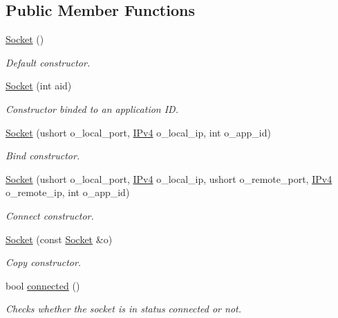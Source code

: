 \subsection*{Public Member Functions}
\begin{DoxyCompactItemize}
\item 
\hyperlink{structudp_1_1Socket_ad92a350104ea7238042779c996de2aa0}{Socket} ()
\begin{DoxyCompactList}\small\item\em Default constructor. \end{DoxyCompactList}\item 
\hyperlink{structudp_1_1Socket_af970d688bc9492294402136069f9deab}{Socket} (int aid)
\begin{DoxyCompactList}\small\item\em Constructor binded to an application ID. \end{DoxyCompactList}\item 
\hyperlink{structudp_1_1Socket_ae9419b8ecda7eb7862991fa114243004}{Socket} (ushort o\+\_\+local\+\_\+port, \hyperlink{structIPv4}{I\+Pv4} o\+\_\+local\+\_\+ip, int o\+\_\+app\+\_\+id)
\begin{DoxyCompactList}\small\item\em Bind constructor. \end{DoxyCompactList}\item 
\hyperlink{structudp_1_1Socket_a9d54379d1f4fa64928070142ad04267c}{Socket} (ushort o\+\_\+local\+\_\+port, \hyperlink{structIPv4}{I\+Pv4} o\+\_\+local\+\_\+ip, ushort o\+\_\+remote\+\_\+port, \hyperlink{structIPv4}{I\+Pv4} o\+\_\+remote\+\_\+ip, int o\+\_\+app\+\_\+id)
\begin{DoxyCompactList}\small\item\em Connect constructor. \end{DoxyCompactList}\item 
\hyperlink{structudp_1_1Socket_abf163ce63fbd305ed2593996b52c3737}{Socket} (const \hyperlink{structudp_1_1Socket}{Socket} \&o)
\begin{DoxyCompactList}\small\item\em Copy constructor. \end{DoxyCompactList}\item 
bool \hyperlink{structudp_1_1Socket_a176759a6b6a7423af91341f72a979bfc}{connected} ()
\begin{DoxyCompactList}\small\item\em Checks whether the socket is in status connected or not. \end{DoxyCompactList}\item 

\end{DoxyCompactItemize}
